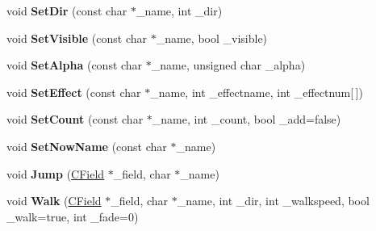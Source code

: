 \begin{DoxyCompactItemize}
\item 
void {\bfseries Set\+Dir} (const char $\ast$\+\_\+name, int \+\_\+dir)\hypertarget{class_c_eve_manager_afbb09f19a49e852dd157d32ab19ab9c6}{}\label{class_c_eve_manager_afbb09f19a49e852dd157d32ab19ab9c6}

\item 
void {\bfseries Set\+Visible} (const char $\ast$\+\_\+name, bool \+\_\+visible)\hypertarget{class_c_eve_manager_ad6f39f63d16bf738574168fc013d7163}{}\label{class_c_eve_manager_ad6f39f63d16bf738574168fc013d7163}

\item 
void {\bfseries Set\+Alpha} (const char $\ast$\+\_\+name, unsigned char \+\_\+alpha)\hypertarget{class_c_eve_manager_a429c6f79450735dee4b975d629b9d63d}{}\label{class_c_eve_manager_a429c6f79450735dee4b975d629b9d63d}

\item 
void {\bfseries Set\+Effect} (const char $\ast$\+\_\+name, int \+\_\+effectname, int \+\_\+effectnum\mbox{[}$\,$\mbox{]})\hypertarget{class_c_eve_manager_aa337fab7ca7e0e3b3c307482800525ee}{}\label{class_c_eve_manager_aa337fab7ca7e0e3b3c307482800525ee}

\item 
void {\bfseries Set\+Count} (const char $\ast$\+\_\+name, int \+\_\+count, bool \+\_\+add=false)\hypertarget{class_c_eve_manager_a88e81c11881a8caf7ba980f5618c79cc}{}\label{class_c_eve_manager_a88e81c11881a8caf7ba980f5618c79cc}

\item 
void {\bfseries Set\+Now\+Name} (const char $\ast$\+\_\+name)\hypertarget{class_c_eve_manager_aa384e6fb4831d74d3ad32e5c52e01c03}{}\label{class_c_eve_manager_aa384e6fb4831d74d3ad32e5c52e01c03}

\item 
void {\bfseries Jump} (\hyperlink{class_c_field}{C\+Field} $\ast$\+\_\+field, char $\ast$\+\_\+name)\hypertarget{class_c_eve_manager_a5100c61ddc22f44a7d8e34545e86d48b}{}\label{class_c_eve_manager_a5100c61ddc22f44a7d8e34545e86d48b}

\item 
void {\bfseries Walk} (\hyperlink{class_c_field}{C\+Field} $\ast$\+\_\+field, char $\ast$\+\_\+name, int \+\_\+dir, int \+\_\+walkspeed, bool \+\_\+walk=true, int \+\_\+fade=0)\hypertarget{class_c_eve_manager_af9bb4ce19f480ad4a0fd7921b86d4aaf}{}\label{class_c_eve_manager_af9bb4ce19f480ad4a0fd7921b86d4aaf}

\end{DoxyCompactItemize}
